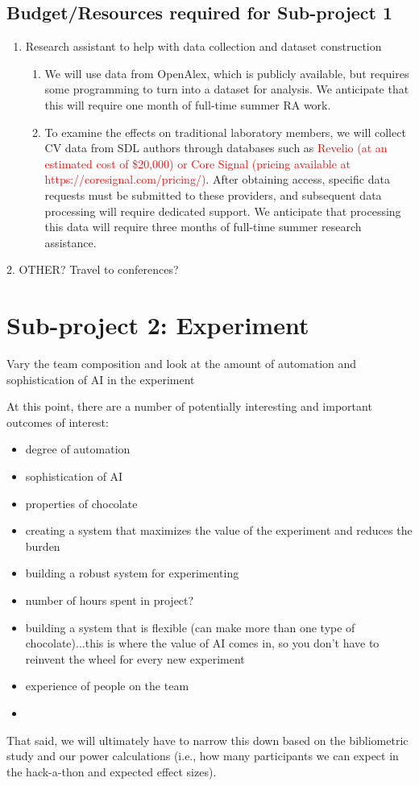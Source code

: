 \documentclass{article}
\begin{document}
\subsection{Budget/Resources required for Sub-project 1}
\begin{enumerate}
    \item Research assistant to help with data collection and dataset construction
    \begin{enumerate}
        \item We will use data from OpenAlex, which is publicly available, but requires some programming to turn into a dataset for analysis. We anticipate that this will require one month of full-time summer RA work.
    \item To examine the effects on traditional laboratory members, we will collect CV data from SDL authors through databases such as \textcolor{red}{Revelio (at an estimated cost of \$20,000) or Core Signal (pricing available at https://coresignal.com/pricing/)}. After obtaining access, specific data requests must be submitted to these providers, and subsequent data processing will require dedicated support. We anticipate that processing this data will require three months of full-time summer research assistance.
    \end{enumerate}
\end{enumerate}
2. OTHER? Travel to conferences?



\section{Sub-project 2: Experiment}

Vary the team composition and look at the amount of automation and sophistication of AI in the experiment

At this point, there are a number of potentially interesting and important outcomes of interest:
\begin{itemize}
    \item  degree of automation
    \item  sophistication of AI
    \item  properties of chocolate
    \item  creating a system that maximizes the value of the experiment and reduces the burden
    \item  building a robust system for experimenting
    \item number of hours spent in project?
    \item  building a system that is flexible (can make more than one type of chocolate)...this is where the value of AI comes in, so you don't have to reinvent the wheel for every new experiment
    \item experience of people on the team
    \item 
\end{itemize}
That said, we will ultimately have to narrow this down based on the bibliometric study and our power calculations (i.e., how many participants we can expect in the hack-a-thon and expected effect sizes).
\end{document}
